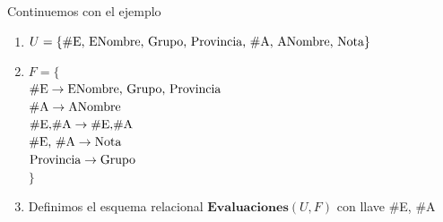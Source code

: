 \begin{frame}{Continuemos con el ejemplo}
    \begin{enumerate}
        \item $U = \{ \textnormal{\#E, ENombre,  Grupo, Provincia, \#A, ANombre, Nota}\}$
        \item $F = \{$ \\
        \hspace{10mm} $\textnormal{\#E} \to \textnormal{ENombre, Grupo, Provincia}$\\
        \hspace{10mm} $\textnormal{\#A} \to \textnormal{ANombre}$\\
        \hspace{10mm} $\textnormal{\#E,\#A} \to \textnormal{\#E,\#A}$\\
        \hspace{10mm} $\textnormal{\#E, \#A} \to \textnormal{Nota}$\\
        \hspace{10mm} $\textnormal{Provincia} \to \textnormal{Grupo}$\\
        $\}$
        \item Definimos el esquema relacional $\textbf{Evaluaciones}(U,F)$ con llave \#E, \#A 
    \end{enumerate}

\end{frame}

